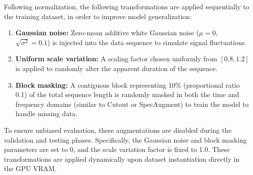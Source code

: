 Following normalization, the following transformations are applied sequentially to the training dataset, in order to improve model generalization:
\begin{enumerate}
    \item \textbf{Gaussian noise:} Zero-mean additive white Gaussian noise ($\mu = 0$, $\sqrt{\sigma^2} = 0.1$) is injected into the data sequence to simulate signal fluctuations.
    \item \textbf{Uniform scale variation:} A scaling factor chosen uniformly from $[0.8, 1.2]$ is applied to randomly alter the apparent duration of the sequence.
    \item \textbf{Block masking:} A contiguous block representing 10\% (proportional ratio 0.1) of the total sequence length is randomly masked in both the time and frequency domains (similar to Cutout or SpecAugment) to train the model to handle missing data.
\end{enumerate}
To ensure unbiased evaluation, these augmentations are disabled during the validation and testing phases. Specifically, the Gaussian noise and block masking parameters are set to 0, and the scale variation factor is fixed to 1.0. These transformations are applied dynamically upon dataset instantiation directly in the GPU VRAM.
